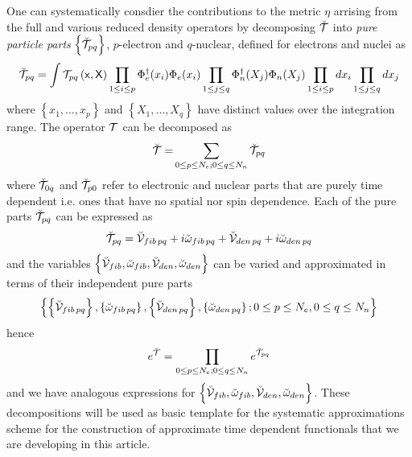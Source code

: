 One can systematically consdier the contributions to the metric $\eta $
arrising from the full and various reduced density operators by decomposing $%
{\cal \breve{T}}$ into {\it pure particle parts }$\left\{ {\cal \breve{T}}%
_{pq}\right\} $, $p$-electron and $q$-nuclear, defined for electrons and
nuclei as%
\begin{equation}
{\cal \breve{T}}_{pq}=\int {\cal T}_{pq}\left( {\sf x,X}\right) \prod_{1\leq
i\leq p}\Phi _{e}^{\dagger }(x_{i})\Phi _{e}(x_{i})\prod_{1\leq j\leq q}\Phi
_{n}^{\dagger }(X_{j})\Phi _{n}(X_{j})\prod_{1\leq i\leq
p}dx_{i}\prod_{1\leq j\leq q}dx_{j}
\end{equation}%
where $\left\{ x_{1},\ldots ,x_{p}\right\} $ and $\left\{ X_{1},\ldots
,X_{q}\right\} $ have distinct values over the integration range. The
operator ${\cal T}$ can be decomposed as 
\begin{equation}
{\cal \breve{T}=}\sum_{0\leq p\leq N_{e};0\leq q\leq N_{n}}{\cal \breve{T}}%
_{pq}
\end{equation}%
where ${\cal \breve{T}}_{0q}$ and ${\cal \breve{T}}_{p0}$ refer to
electronic and nuclear parts that are purely time dependent i.e. ones that
have no spatial nor spin dependence. Each of the pure parts ${\cal \breve{T}}%
_{pq}$ can be expressed as 
\begin{equation}
{\cal \breve{T}}_{pq}={\cal \breve{V}}_{fib\,pq}+i\breve{\omega}_{fib\,pq}+%
{\cal \breve{V}}_{den\,pq}+i\breve{\omega}_{den\,pq}
\end{equation}%
and the variables $\left\{ {\cal \breve{V}}_{fib},\breve{\omega}_{fib},{\cal 
\breve{V}}_{den},\breve{\omega}_{den}\right\} $ can be varied and
approximated in terms of their independent pure parts 
\begin{equation}
\left\{ \left\{ {\cal \breve{V}}_{fib\,pq}\right\} ,\left\{ \breve{\omega}%
_{fib\,pq}\right\} ,\left\{ {\cal \breve{V}}_{den\,pq}\right\} ,\left\{ 
\breve{\omega}_{den\,pq}\right\} ;0\leq p\leq N_{e},0\leq q\leq N_{n}\right\}
\end{equation}
hence 
\begin{equation}
e^{{\cal \breve{T}}}=\prod_{0\leq p\leq N_{e};0\leq q\leq N_{n}}e^{{\cal 
\breve{T}}_{pq}}
\end{equation}%
and we have analogous expressions for $\left\{ {\cal \breve{V}}_{fib},\breve{%
\omega}_{fib},{\cal \breve{V}}_{den},\breve{\omega}_{den}\right\} $. These
decompositions will be used as basic template for the systematic
approximations scheme for the construction of approximate time dependent
functionals that we are developing in this article.

